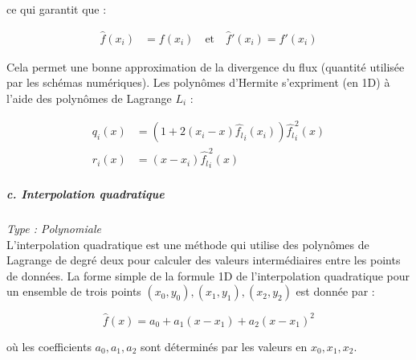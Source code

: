 \vspace{-0,3 cm}

ce qui garantit que :

\vspace{-0,2 cm}

\begin{equation}
    \begin{aligned}
        \hat{f}(x_i) &= f(x_i) \quad \text{et} \quad \hat{f}'(x_i) = f'(x_i)
    \end{aligned}
\end{equation}



Cela permet une bonne approximation de la divergence du flux (quantité utilisée par les schémas numériques). Les polynômes d'Hermite s'expriment (en 1D) à l'aide des polynômes de Lagrange $L_i$ :

\begin{equation}
    \begin{aligned}
        q_i(x) &= \left(1 + 2(x_i - x) \hat{f_l}_i(x_i)\right) \hat{f_l}_i^2(x) \\
        r_i(x) &= (x - x_i) \hat{f_l}_i^2(x)
    \end{aligned}
\end{equation}



\newpage

\subparagraph{c. Interpolation quadratique \cite{alexis}}
\textit{Type : Polynomiale} \\
\phantom{----}L'interpolation quadratique est une méthode qui utilise des polynômes de Lagrange de degré deux pour calculer des valeurs intermédiaires entre les points de données.
La forme simple de la formule 1D de l'interpolation quadratique pour un ensemble de trois points \( (x_0, y_0), (x_1, y_1), (x_2, y_2) \) est donnée par :

\vspace{-0,3 cm}

\begin{equation}
    \hat{f}(x) = a_0 + a_1(x - x_1) + a_2(x - x_1)^2
\end{equation}

où les coefficients \( a_0, a_1, a_2 \) sont déterminés par les valeurs en \( x_0, x_1, x_2 \).

